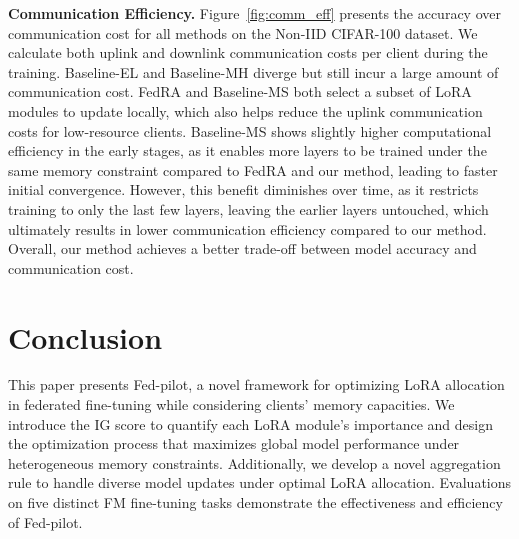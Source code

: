 \documentclass[sigconf]{acmart}
\begin{document}

\textbf{Communication Efficiency.} 
Figure~\ref{fig:comm_eff} presents the accuracy over communication cost for all methods on the Non-IID CIFAR-100 dataset.
We calculate both uplink and downlink communication costs per client during the training. Baseline-EL and Baseline-MH diverge but still incur a large amount of communication cost. FedRA and Baseline-MS both select a subset of LoRA modules to update locally, which also helps reduce the uplink communication costs for low-resource clients.  
% 
Baseline-MS shows slightly higher computational efficiency in the early stages, as it enables more layers to be trained under the same memory constraint compared to FedRA and our method, leading to faster initial convergence.
However, this benefit diminishes over time, as it restricts training to only the last few layers, leaving the earlier layers untouched, which ultimately results in lower communication efficiency compared to our method. Overall, our method achieves a better trade-off between model accuracy and communication cost.

\section{Conclusion}\label{conclusion}
This paper presents Fed-pilot, a novel framework for optimizing LoRA allocation in federated fine-tuning while considering clients' memory capacities. We introduce the IG score to quantify each LoRA module's importance and design the optimization process that maximizes global model performance under heterogeneous memory constraints. Additionally, we develop a novel aggregation rule to handle diverse model updates under optimal LoRA allocation. Evaluations on five distinct FM fine-tuning tasks demonstrate the effectiveness and efficiency of Fed-pilot.





\end{document}

